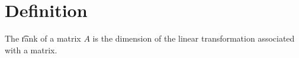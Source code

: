 

\section*{Definition}

The \t{rank} of a matrix $A$ is the dimension of the linear transformation associated with a matrix.

\blankpage